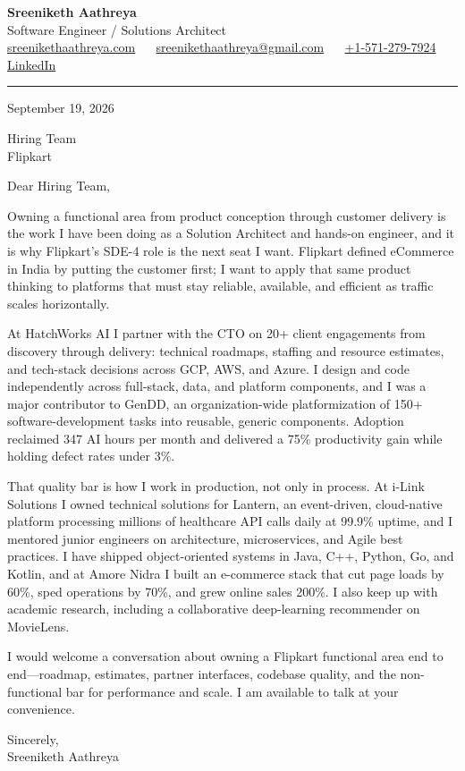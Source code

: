 \documentclass[11pt, letterpaper]{article}
\begin{document}
{\fontsize{18 pt}{20 pt}\selectfont\bfseries Sreeniketh Aathreya}\\[4pt]
Software Engineer / Solutions Architect\\[6pt]
\href{https://sreenikethaathreya.com}{sreenikethaathreya.com}
~\textbullet~
\href{mailto:sreenikethaathreya@gmail.com}{sreenikethaathreya@gmail.com}
~\textbullet~
\href{tel:+1-571-279-7924}{+1-571-279-7924}
~\textbullet~
\href{https://www.linkedin.com/in/sreeniketh-aathreya-16800b122/}{LinkedIn}

\vspace{12pt}
\hrule
\vspace{12pt}

September 19, 2026

\vspace{8pt}

Hiring Team\\
Flipkart

\vspace{12pt}

Dear Hiring Team,

Owning a functional area from product conception through customer delivery is the work I have been doing as a Solution Architect and hands-on engineer, and it is why Flipkart's SDE-4 role is the next seat I want. Flipkart defined eCommerce in India by putting the customer first; I want to apply that same product thinking to platforms that must stay reliable, available, and efficient as traffic scales horizontally.

At HatchWorks AI I partner with the CTO on 20+ client engagements from discovery through delivery: technical roadmaps, staffing and resource estimates, and tech-stack decisions across GCP, AWS, and Azure. I design and code independently across full-stack, data, and platform components, and I was a major contributor to GenDD, an organization-wide platformization of 150+ software-development tasks into reusable, generic components. Adoption reclaimed 347 AI hours per month and delivered a 75\% productivity gain while holding defect rates under 3\%.

That quality bar is how I work in production, not only in process. At i-Link Solutions I owned technical solutions for Lantern, an event-driven, cloud-native platform processing millions of healthcare API calls daily at 99.9\% uptime, and I mentored junior engineers on architecture, microservices, and Agile best practices. I have shipped object-oriented systems in Java, C++, Python, Go, and Kotlin, and at Amore Nidra I built an e-commerce stack that cut page loads by 60\%, sped operations by 70\%, and grew online sales 200\%. I also keep up with academic research, including a collaborative deep-learning recommender on MovieLens.

I would welcome a conversation about owning a Flipkart functional area end to end---roadmap, estimates, partner interfaces, codebase quality, and the non-functional bar for performance and scale. I am available to talk at your convenience.

Sincerely,\\[12pt]
Sreeniketh Aathreya
\end{document}
